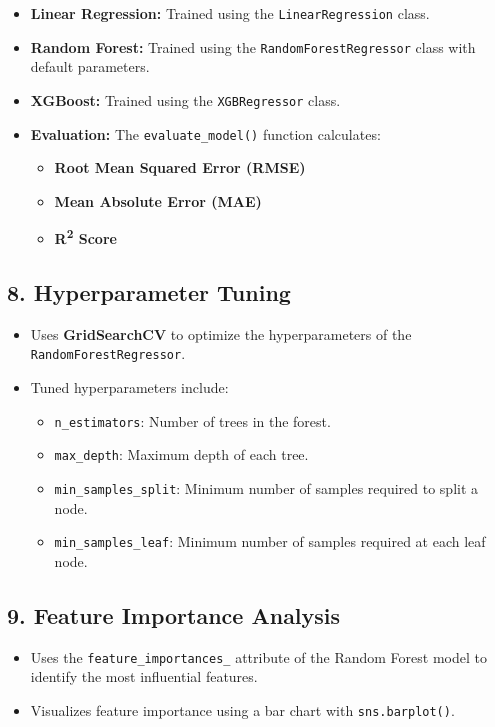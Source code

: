 \documentclass[journal]{IEEEtran}
\begin{document}
\begin{itemize}
    \item \textbf{Linear Regression:} Trained using the \texttt{LinearRegression} class.
    \item \textbf{Random Forest:} Trained using the \texttt{RandomForestRegressor} class with default parameters.
    \item \textbf{XGBoost:} Trained using the \texttt{XGBRegressor} class.
    \item \textbf{Evaluation:} The \texttt{evaluate\_model()} function calculates:
    \begin{itemize}
        \item \textbf{Root Mean Squared Error (RMSE)}
        \item \textbf{Mean Absolute Error (MAE)}
        \item \textbf{R\textsuperscript{2} Score}
    \end{itemize}
\end{itemize}

\subsection{8. Hyperparameter Tuning}

\begin{itemize}
    \item Uses \textbf{GridSearchCV} to optimize the hyperparameters of the \texttt{RandomForestRegressor}.
    \item Tuned hyperparameters include:
    \begin{itemize}
        \item \texttt{n\_estimators}: Number of trees in the forest.
        \item \texttt{max\_depth}: Maximum depth of each tree.
        \item \texttt{min\_samples\_split}: Minimum number of samples required to split a node.
        \item \texttt{min\_samples\_leaf}: Minimum number of samples required at each leaf node.
    \end{itemize}
\end{itemize}

\subsection{9. Feature Importance Analysis}

\begin{itemize}
    \item Uses the \texttt{feature\_importances\_} attribute of the Random Forest model to identify the most influential features.
    \item Visualizes feature importance using a bar chart with \texttt{sns.barplot()}.
\end{itemize}
\end{document}
